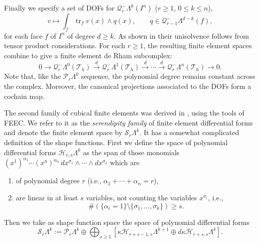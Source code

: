 {Finally we specify a set of DOFs for $\mathcal Q_r^-\Lambda^k(I^n)$ ($r\geq1$, $0\leq k\leq n$),}
\begin{equation}\label{eq:tensor-product-form-dofs}
v\mapsto\int_f\operatorname{tr}_fv(x)\wedge q(x),\qquad q\in\mathcal Q_{r-1}^-\Lambda^{d-k}(f),
\end{equation}
{for each face $f$ of $I^n$ of degree $d\geq k$. As shown in  their unisolvence follows from tensor product considerations. For each $r\geq1$, the resulting finite element spaces combine to give a finite element de Rham subcomplex:}
\[
0\to\mathcal Q_r^-\Lambda^0(\mathcal T_h)\xrightarrow{d}\mathcal Q_r^-\Lambda^1(\mathcal T_h)\xrightarrow{d}\cdots\xrightarrow{d}\mathcal Q_r^-\Lambda^n(\mathcal T_h)\to0.
\]
{Note that, like the $\mathcal P_r\Lambda^k$ sequence, the polynomial degree remains constant across the complex. Moreover, the canonical projections associated to the DOFs form a cochain map.}

{The second family of cubical finite elements was derived in , using the tools of FEEC. We refer to it as the \emph{serendipity family} of finite element differential forms and denote the finite element space by $\mathcal S_r\Lambda^k$. It has a somewhat complicated definition of the shape functions. First we define the space of polynomial differential forms $\mathcal H_{r,s}\Lambda^k$ as the span of those monomials $(x^1)^{\alpha_1}\cdots(x^n)^{\alpha_n}\,dx^{\sigma_1}\wedge\cdots\wedge dx^{\sigma_k}$ which are}
\begin{enumerate}
\item{of polynomial degree $r$ (i.e., $\alpha_1+\cdots+\alpha_n=r$),}
\item{are linear in at least $s$ variables, not counting the variables $x^{\sigma_i}$, i.e.,}
\[
\#(\{\alpha_i=1\}\setminus\{\sigma_1,\ldots,\sigma_k\})\geq s.
\]
\end{enumerate}
{Then we take as shape function space the space of polynomial differential forms}
\[
\mathcal S_r\Lambda^k:=\mathcal P_r\Lambda^k\oplus\bigoplus_{s\geq1}[\kappa\mathcal H_{r+s-1,s}\Lambda^{k+1}\oplus d\kappa\mathcal H_{r+s,s}\Lambda^k].
\]

